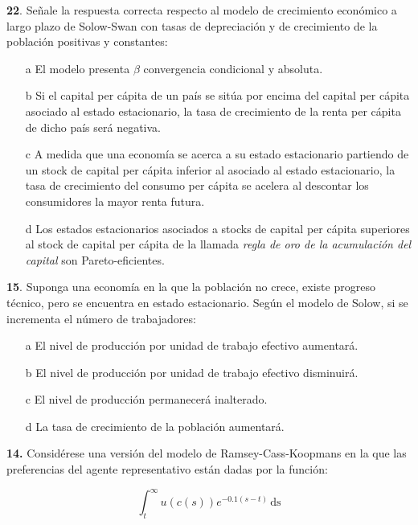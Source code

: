 \documentclass{nuevotema}
\begin{document}

\textbf{22}. Señale la respuesta correcta respecto al modelo de crecimiento económico a largo plazo de Solow-Swan con tasas de depreciación y de crecimiento de la población positivas y constantes:

\begin{enumerate}
    \item[a] El modelo presenta $\beta$ convergencia condicional y absoluta.
    \item[b] Si el capital per cápita de un país se sitúa por encima del capital per cápita asociado al estado estacionario, la tasa de crecimiento de la renta per cápita de dicho país será negativa.
    \item[c] A medida que una economía se acerca a su estado estacionario partiendo de un stock de capital per cápita inferior al asociado al estado estacionario, la tasa de crecimiento del consumo per cápita se acelera al descontar los consumidores la mayor renta futura.
    \item[d] Los estados estacionarios asociados a stocks de capital per cápita superiores al stock de capital per cápita de la llamada \textit{regla de oro de la acumulación del capital} son Pareto-eficientes. 
\end{enumerate}


\textbf{15}. Suponga una economía en la que la población no crece, existe progreso técnico, pero se encuentra en estado estacionario. Según el modelo de Solow, si se incrementa el número de trabajadores:

\begin{enumerate}
    \item[a] El nivel de producción por unidad de trabajo efectivo aumentará.
    \item[b] El nivel de producción por unidad de trabajo efectivo disminuirá.
    \item[c] El nivel de producción permanecerá inalterado.
    \item[d] La tasa de crecimiento de la población aumentará.
\end{enumerate}


\textbf{14.} Considérese una versión del modelo de Ramsey-Cass-Koopmans en la que las preferencias del agente representativo están dadas por la función:

\begin{equation}
\int_t^\infty u\left( c(s) \right) e^{-0.1(s-t)} \, \text{ds}
\end{equation}
\end{document}
